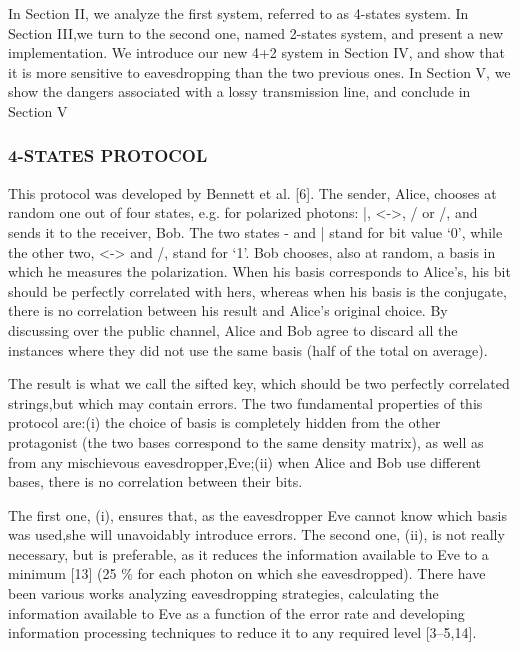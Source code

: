 In Section II, we analyze the first system, referred to as 4-states system. In Section III,we turn to the second one, named 2-states system, and present a new implementation.
We introduce our new 4+2 system in Section IV, and show that it is more sensitive to eavesdropping than the two previous ones. In Section V, we show the dangers associated with a lossy transmission line, and conclude in Section V

\subsubsection{4-STATES PROTOCOL}

This protocol was developed by Bennett et al. [6]. The sender, Alice, chooses at random one out of four states, e.g. for polarized photons: |, <->, / or /, and sends it to the receiver, Bob. The two states - and | stand for bit value ‘0’, while the other two, <-> and /, stand for ‘1’. Bob chooses, also at random, a basis in which he measures the polarization. When his basis corresponds to Alice’s, his bit should be perfectly correlated with hers, whereas when his basis is the conjugate, there is no correlation between his result and Alice’s original choice. By discussing over the public channel, Alice and Bob agree to discard all the instances where they did not use the same basis (half of the total on average).

The result is what we call the sifted key, which should be two perfectly correlated strings,but which may contain errors. The two fundamental properties of this protocol are:(i) the choice of basis is completely hidden from the other protagonist (the two bases correspond to the same density matrix), as well as from any mischievous eavesdropper,Eve;(ii) when Alice and Bob use different bases, there is no correlation between their bits.

The first one, (i), ensures that, as the eavesdropper Eve cannot know which basis was used,she will unavoidably introduce errors. The second one, (ii), is not really necessary, but is preferable, as it reduces the information available to Eve to a minimum [13] (25 \% for each photon on which she eavesdropped). There have been various works analyzing eavesdropping strategies, calculating the information available to Eve as a function of the error rate and developing information processing techniques to reduce it to any required level [3–5,14].

